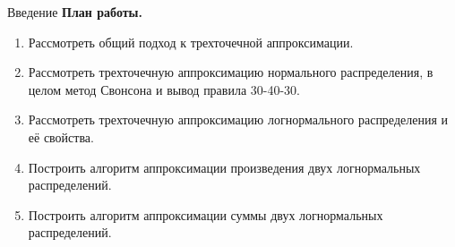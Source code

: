 \documentclass[ucs, notheorems, handout]{beamer}
\begin{document}
	
	\begin{frame}{Введение}
		\textbf{План работы.}
		\begin{enumerate}
			\item Рассмотреть общий подход к трехточечной аппроксимации.
			\item Рассмотреть трехточечную аппроксимацию нормального распределения, в целом метод Свонсона и вывод правила 30-40-30.
			\item Рассмотреть трехточечную аппроксимацию логнормального распределения и её  свойства.
			\item Построить алгоритм аппроксимации произведения двух логнормальных распределений.
			\item Построить алгоритм аппроксимации суммы двух логнормальных распределений.
		\end{enumerate}
	
	\end{frame}
	
\end{document}
